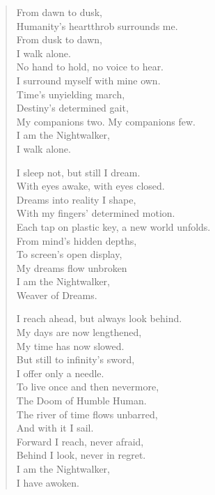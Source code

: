 \documentclass[11pt,letterpaper]{article}
\begin{document}
\begin{verse}
From dawn to dusk,\\
Humanity's heartthrob surrounds me.\\
From dusk to dawn,\\
I walk alone.\\
No hand to hold, no voice to hear.\\
I surround myself with mine own.\\
Time's unyielding march,\\
Destiny's determined gait,\\
My companions two. My companions few.\\
I am the Nightwalker,\\
I walk alone. 

I sleep not, but still I dream.\\
With eyes awake, with eyes closed.\\
Dreams into reality I shape,\\
With my fingers' determined motion.\\
Each tap on plastic key, a new world unfolds.\\
From mind's hidden depths,\\
To screen's open display,\\
My dreams flow unbroken \\
I am the Nightwalker,\\
Weaver of Dreams. 

I reach ahead, but always look behind.\\
My days are now lengthened,\\
My time has now slowed.\\
But still to infinity's sword,\\
I offer only a needle.\\
To live once and then nevermore,\\
The Doom of Humble Human.\\
The river of time flows unbarred,\\
And with it I sail.\\
Forward I reach, never afraid,\\
Behind I look, never in regret.\\
I am the Nightwalker,\\
I have awoken.

\end{verse}

\begin{center}

\end{center}
\end{document}
